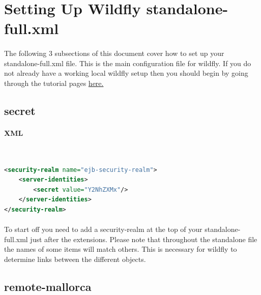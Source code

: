 \documentclass[
10pt, %
letterpaper, %
oneside, %
headinclude,footinclude, %
BCOR5mm, %
]{scrartcl}
\begin{document}

\section{Setting Up Wildfly standalone-full.xml}


\paragraph{} The following 3 subsections of this document cover how to set up your standalone-full.xml file. This is the main configuration file for wildfly. If you do not already have a working local wildfly setup then you should begin by going through the tutorial pages \href{https://docs.jboss.org/author/display/WFLY8/Getting+Started+Developing+Applications+Guide}{here.}


\subsection{secret}


\paragraph{XML}~
\begin{lstlisting}[language=XML]
<security-realm name="ejb-security-realm">
	<server-identities>
		<secret value="Y2NhZXMx"/>
	</server-identities>
</security-realm>
\end{lstlisting}

\paragraph{} To start off you need to add a security-realm at the top of your standalone-full.xml just after the extensions. Please note that throughout the standalone file the names of some items will match others. This is necessary for wildfly to determine links between the different objects. 


\subsection{remote-mallorca}
\end{document}
